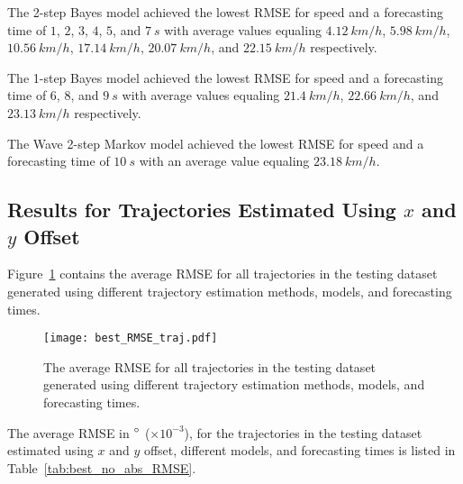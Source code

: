 \documentclass[preprint,12pt]{elsarticle}
\begin{document}
The 2-step Bayes model achieved the lowest RMSE for speed and a forecasting time of $1$, $2$, $3$, $4$, $5$, and $7 \ s$ with average values equaling $4.12 \ km/h$, $5.98 \ km/h$, $10.56 \ km/h$, $17.14 \ km/h$, $20.07 \ km/h$, and $22.15 \ km/h$ respectively.

The 1-step Bayes model achieved the lowest RMSE for speed and a forecasting time of $6$, $8$, and $9 \ s$ with average values equaling $21.4 \ km/h$, $22.66 \ km/h$, and $23.13 \ km/h$ respectively.

The Wave 2-step Markov model achieved the lowest RMSE for speed and a forecasting time of $10 \ s$ with an average value equaling $23.18 \ km/h$.

\subsection{Results for Trajectories Estimated Using $x$ and $y$ Offset}

Figure~\ref{fig:best_RMSE_traj} contains the average RMSE for all trajectories in the testing dataset generated using different trajectory estimation methods, models, and forecasting times.

\begin{figure}[!ht]
	\centering
	\texttt{[image: best\_RMSE\_traj.pdf]}
	\caption{The average RMSE for all trajectories in the testing dataset generated using different trajectory estimation methods, models, and forecasting times.}
	\label{fig:best_RMSE_traj}
\end{figure}

The average RMSE in $\degree$ ($\times 10^{-3}$), for the trajectories in the testing dataset estimated using $x$ and $y$ offset, different models, and forecasting times is listed in Table~\ref{tab:best_no_abs_RMSE}.
\end{document}
